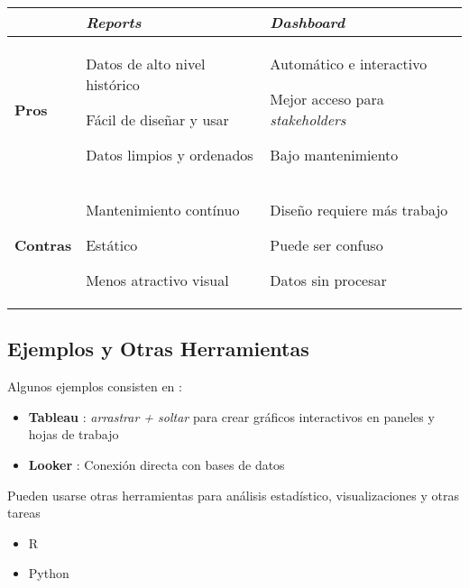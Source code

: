 \begin{table}
    \centering
    \begin{tabular}{|p{1.8cm}|p{5.9cm}|p{5.9cm}|}
        \hline
        & \textbf{\textit{Reports}} & \textbf{\textit{Dashboard}} \\
        \hline
        \textbf{Pros} & \begin{description}
            \item {Datos de alto nivel histórico}
            \item {Fácil de diseñar y usar}
            \item {Datos limpios y ordenados}
        \end{description} & \begin{description}
            \item {Automático e interactivo}
            \item {Mejor acceso para \textit{stakeholders}}
            \item {Bajo mantenimiento}
        \end{description} \\
        \hline
        \textbf{Contras} & \begin{description}
            \item {Mantenimiento contínuo}
            \item {Estático}
            \item {Menos atractivo visual}
        \end{description} & \begin{description}
            \item {Diseño requiere más trabajo}
            \item {Puede ser confuso}
            \item {Datos sin procesar}
        \end{description} \\
        \hline
    \end{tabular}
\end{table}
    

\subsection{Ejemplos y Otras Herramientas}
Algunos ejemplos consisten en :
\begin{itemize}
        \item {\textbf{Tableau} : \textit{arrastrar + soltar} para crear gráficos interactivos en paneles y hojas de trabajo}
        \item {\textbf{Looker} : Conexión directa con bases de datos}
\end{itemize}
Pueden usarse otras herramientas para análisis estadístico, visualizaciones y otras tareas
\begin{itemize}
    \item {R}
    \item {Python}
\end{itemize}

\newpage
